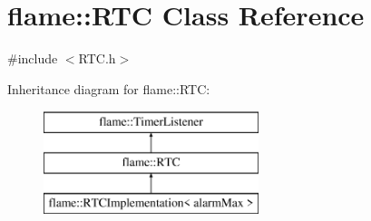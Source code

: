 \hypertarget{classflame_1_1_r_t_c}{\section{flame\-:\-:R\-T\-C Class Reference}
\label{classflame_1_1_r_t_c}
}


{\ttfamily \#include $<$R\-T\-C.\-h$>$}

Inheritance diagram for flame\-:\-:R\-T\-C\-:\begin{figure}[H]
\begin{center}
\leavevmode
\includegraphics[height=3.000000cm]{classflame_1_1_r_t_c}
\end{center}
\end{figure}
